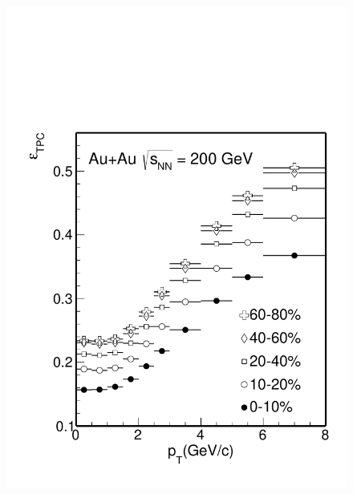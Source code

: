 
\begin{figure}[htbp]
\begin{minipage}[htbp]{0.52\linewidth}
\centering
\includegraphics[width=1.0\textwidth,angle=0]{figure/Run14_D0HFT/Datad0Eff_tpc.pdf}

\end{minipage}
\end{figure}
